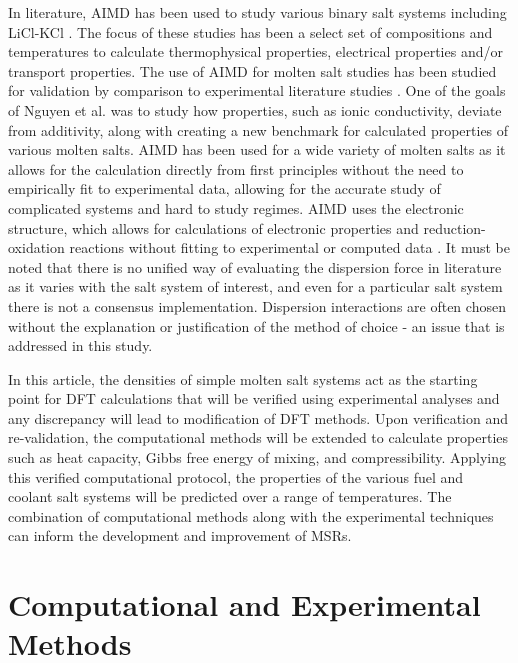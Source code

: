 \documentclass[review]{elsarticle}
\begin{document}
In literature, AIMD has been used to study various binary salt systems including LiCl-KCl \cite{Bengston2014,NGUYEN2021}. The focus of these studies has been a select set of compositions and temperatures to calculate thermophysical properties, electrical properties and/or transport properties. The use of AIMD for molten salt studies has been studied for validation by comparison to experimental literature studies \cite{Bengston2014}. One of the goals of Nguyen et al. \cite{NGUYEN2021} was to study how properties, such as ionic conductivity, deviate from additivity, along with creating a new benchmark for calculated properties of various molten salts. AIMD has been used for a wide variety of molten salts as it allows for the calculation directly from first principles without the need to empirically fit to experimental data, allowing for the accurate study of complicated systems and hard to study regimes. AIMD uses the electronic structure, which allows for calculations of electronic properties and reduction-oxidation reactions without fitting to experimental or computed data \cite{Bengston2014}. It must be noted that there is no unified way of evaluating the dispersion force in literature as it varies with the salt system of interest, and even for a particular salt system there is not a consensus implementation. Dispersion interactions are often chosen without the explanation or justification of the method of choice - an issue that is addressed in this study.

 In this article, the densities of simple molten salt systems act as the starting point for DFT calculations that will be verified using experimental analyses and any discrepancy will lead to modification of DFT methods. Upon verification and re-validation, the computational methods will be extended to calculate properties such as heat capacity, Gibbs free energy of mixing, and compressibility. Applying this verified computational protocol, the properties of the various fuel and coolant salt systems will be predicted over a range of temperatures. The combination of computational methods along with the experimental techniques can inform the development and improvement of MSRs. 


\section{Computational and Experimental Methods}
\end{document}
